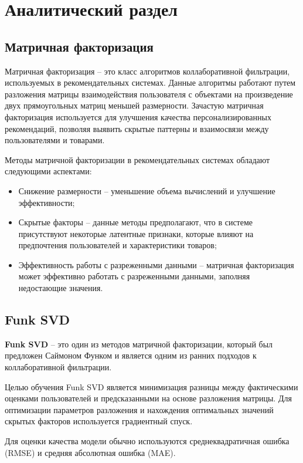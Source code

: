 \section{Аналитический раздел}

\subsection{Матричная факторизация}
Матричная факторизация -- это класс алгоритмов коллаборативной фильтрации, используемых в рекомендательных системах. Данные алгоритмы работают путем разложения матрицы взаимодействия пользователя с объектами на произведение двух прямоугольных матриц меньшей размерности. Зачастую матричная факторизация используется для улучшения качества персонализированных рекомендаций, позволяя выявить скрытые паттерны и взаимосвязи между пользователями и товарами.\cite{factorization}

Методы матричной факторизации в рекомендательных системах обладают следующими аспектами:

\begin{itemize}
	\item Снижение размерности -- уменьшение объема вычислений и улучшение эффективности;
	\item Скрытые факторы -- данные методы предполагают, что в системе присутствуют некоторые латентные признаки, которые влияют на предпочтения пользователей и характеристики товаров;
	\item Эффективность работы с разреженными данными -- матричная факторизация может эффективно работать с разреженными данными, заполняя недостающие значения.
\end{itemize}

\subsection{Funk SVD}
\textbf{Funk SVD} -- это один из методов матричной факторизации, который был предложен Саймоном Функом и является одним из ранних подходов к коллаборативной фильтрации.

Целью обучения Funk SVD является минимизация разницы между фактическими оценками пользователей и предсказанными на основе разложения матрицы. Для оптимизации параметров разложения и нахождения оптимальных значений скрытых факторов используется градиентный спуск. \cite{svd}

Для оценки качества модели обычно используются среднеквадратичная ошибка (RMSE) и средняя абсолютная ошибка (MAE).

